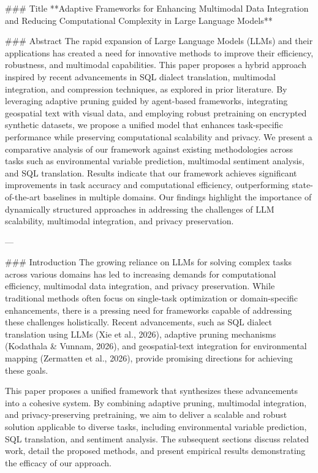 ### Title
**Adaptive Frameworks for Enhancing Multimodal Data Integration and Reducing Computational Complexity in Large Language Models**

### Abstract
The rapid expansion of Large Language Models (LLMs) and their applications has created a need for innovative methods to improve their efficiency, robustness, and multimodal capabilities. This paper proposes a hybrid approach inspired by recent advancements in SQL dialect translation, multimodal integration, and compression techniques, as explored in prior literature. By leveraging adaptive pruning guided by agent-based frameworks, integrating geospatial text with visual data, and employing robust pretraining on encrypted synthetic datasets, we propose a unified model that enhances task-specific performance while preserving computational scalability and privacy. We present a comparative analysis of our framework against existing methodologies across tasks such as environmental variable prediction, multimodal sentiment analysis, and SQL translation. Results indicate that our framework achieves significant improvements in task accuracy and computational efficiency, outperforming state-of-the-art baselines in multiple domains. Our findings highlight the importance of dynamically structured approaches in addressing the challenges of LLM scalability, multimodal integration, and privacy preservation.

---

### Introduction
The growing reliance on LLMs for solving complex tasks across various domains has led to increasing demands for computational efficiency, multimodal data integration, and privacy preservation. While traditional methods often focus on single-task optimization or domain-specific enhancements, there is a pressing need for frameworks capable of addressing these challenges holistically. Recent advancements, such as SQL dialect translation using LLMs (Xie et al., 2026), adaptive pruning mechanisms (Kodathala & Vunnam, 2026), and geospatial-text integration for environmental mapping (Zermatten et al., 2026), provide promising directions for achieving these goals.

This paper proposes a unified framework that synthesizes these advancements into a cohesive system. By combining adaptive pruning, multimodal integration, and privacy-preserving pretraining, we aim to deliver a scalable and robust solution applicable to diverse tasks, including environmental variable prediction, SQL translation, and sentiment analysis. The subsequent sections discuss related work, detail the proposed methods, and present empirical results demonstrating the efficacy of our approach.

